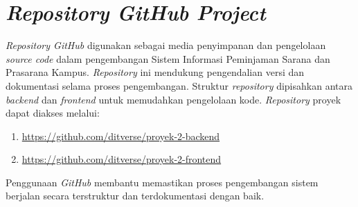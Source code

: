 \section{\textit{Repository GitHub Project}}
\textit{Repository GitHub} digunakan sebagai media penyimpanan dan pengelolaan \textit{source code} dalam pengembangan Sistem Informasi Peminjaman Sarana dan Prasarana Kampus. \textit{Repository} ini mendukung pengendalian versi dan dokumentasi selama proses pengembangan. Struktur \textit{repository} dipisahkan antara \textit{backend} dan \textit{frontend} untuk memudahkan pengelolaan kode. \textit{Repository} proyek dapat diakses melalui:
\begin{enumerate}[label=(\alph*)]
    \item \url{https://github.com/ditverse/proyek-2-backend}
    \item \url{https://github.com/ditverse/proyek-2-frontend}
\end{enumerate}
Penggunaan \textit{GitHub} membantu memastikan proses pengembangan sistem berjalan secara terstruktur dan terdokumentasi dengan baik.
